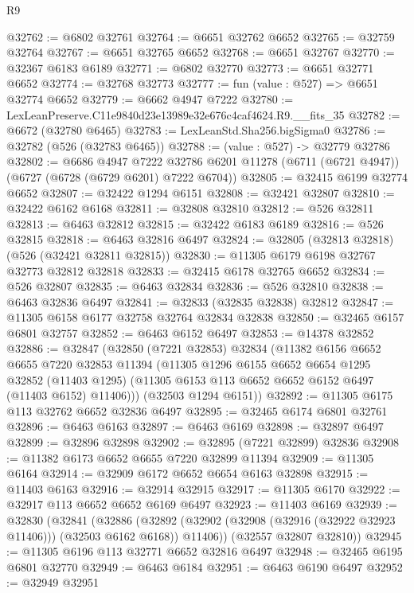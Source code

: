 \begin{lexlean}{R9}
\begin{coremodule}
@32762 := @6802 @32761
@32764 := @6651 @32762 @6652
@32765 := @32759 @32764
@32767 := @6651 @32765 @6652
@32768 := @6651 @32767
@32770 := @32367 @6183 @6189
@32771 := @6802 @32770
@32773 := @6651 @32771 @6652
@32774 := @32768 @32773
@32777 := fun (value : @527) => @6651 @32774 @6652
@32779 := @6662 @4947 @7222
@32780 := LexLeanPreserve.C11e9840d23e13989e32e676c4caf4624.R9.__fits_35
@32782 := @6672 (@32780 @6465)
@32783 := LexLeanStd.Sha256.bigSigma0
@32786 := @32782 (@526 (@32783 @6465))
@32788 := (value : @527) -> @32779 @32786
@32802 := @6686
    @4947
    @7222
    @32786
    @6201
    @11278
    (@6711 (@6721 @4947))
    (@6727 (@6728 (@6729 @6201) @7222 @6704))
@32805 := @32415 @6199 @32774 @6652
@32807 := @32422 @1294 @6151
@32808 := @32421 @32807
@32810 := @32422 @6162 @6168
@32811 := @32808 @32810
@32812 := @526 @32811
@32813 := @6463 @32812
@32815 := @32422 @6183 @6189
@32816 := @526 @32815
@32818 := @6463 @32816 @6497
@32824 := @32805 (@32813 @32818) (@526 (@32421 @32811 @32815))
@32830 := @11305 @6179 @6198 @32767 @32773 @32812 @32818
@32833 := @32415 @6178 @32765 @6652
@32834 := @526 @32807
@32835 := @6463 @32834
@32836 := @526 @32810
@32838 := @6463 @32836 @6497
@32841 := @32833 (@32835 @32838) @32812
@32847 := @11305 @6158 @6177 @32758 @32764 @32834 @32838
@32850 := @32465 @6157 @6801 @32757
@32852 := @6463 @6152 @6497
@32853 := @14378 @32852
@32886 := @32847
    (@32850
      (@7221 @32853)
      @32834
      (@11382
        @6156
        @6652
        @6655
        @7220
        @32853
        @11394
        (@11305
          @1296
          @6155
          @6652
          @6654
          @1295
          @32852
          (@11403 @1295)
          (@11305 @6153 @113 @6652 @6652 @6152 @6497 (@11403 @6152) @11406)))
      (@32503 @1294 @6151))
@32892 := @11305 @6175 @113 @32762 @6652 @32836 @6497
@32895 := @32465 @6174 @6801 @32761
@32896 := @6463 @6163
@32897 := @6463 @6169
@32898 := @32897 @6497
@32899 := @32896 @32898
@32902 := @32895 (@7221 @32899) @32836
@32908 := @11382 @6173 @6652 @6655 @7220 @32899 @11394
@32909 := @11305 @6164
@32914 := @32909 @6172 @6652 @6654 @6163 @32898
@32915 := @11403 @6163
@32916 := @32914 @32915
@32917 := @11305 @6170
@32922 := @32917 @113 @6652 @6652 @6169 @6497
@32923 := @11403 @6169
@32939 := @32830
    (@32841
      (@32886
        (@32892 (@32902 (@32908 (@32916 (@32922 @32923 @11406))) (@32503 @6162 @6168)) @11406))
      (@32557 @32807 @32810))
@32945 := @11305 @6196 @113 @32771 @6652 @32816 @6497
@32948 := @32465 @6195 @6801 @32770
@32949 := @6463 @6184
@32951 := @6463 @6190 @6497
@32952 := @32949 @32951

\end{coremodule}
\end{lexlean}
